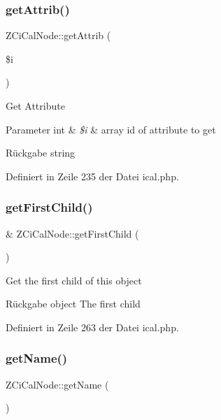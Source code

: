 \subsubsection{\texorpdfstring{get\+Attrib()}{getAttrib()}}
{\footnotesize\ttfamily Z\+Ci\+Cal\+Node\+::get\+Attrib (\begin{DoxyParamCaption}\item[{}]{\$i }\end{DoxyParamCaption})}

Get Attribute


\begin{DoxyParams}[1]{Parameter}
int & {\em \$i} & array id of attribute to get\\
\hline
\end{DoxyParams}
\begin{DoxyReturn}{Rückgabe}
string 
\end{DoxyReturn}


Definiert in Zeile 235 der Datei ical.\+php.

\mbox{\label{class_z_ci_cal_node_a22f136b7820093017b9d5cc071feda63}} 
\subsubsection{\texorpdfstring{get\+First\+Child()}{getFirstChild()}}
{\footnotesize\ttfamily \& Z\+Ci\+Cal\+Node\+::get\+First\+Child (\begin{DoxyParamCaption}{ }\end{DoxyParamCaption})}

Get the first child of this object

\begin{DoxyReturn}{Rückgabe}
object The first child 
\end{DoxyReturn}


Definiert in Zeile 263 der Datei ical.\+php.

\mbox{\label{class_z_ci_cal_node_ac3b6389ed651b427432df1a4d7a85c2d}} 
\subsubsection{\texorpdfstring{get\+Name()}{getName()}}
{\footnotesize\ttfamily Z\+Ci\+Cal\+Node\+::get\+Name (\begin{DoxyParamCaption}{ }\end{DoxyParamCaption})}

